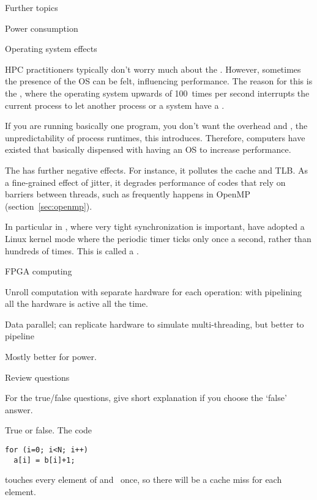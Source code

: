  {Further topics}

 {Power consumption}
\label{sec:power}


 {Operating system effects}

HPC practitioners typically don't worry much about the
. However, sometimes the presence of the \ac{OS} can be
felt, influencing performance. The reason for this is the
, where the operating system upwards
of 100~times per second interrupts the current process to let another
process or a system  have a .

If you are running basically one program, you don't want the overhead and
, the unpredictability of process
runtimes, this introduces. Therefore, computers have existed that basically dispensed
with having an \ac{OS} to increase performance.

The  has further negative
effects. For instance, it pollutes the cache and
\ac{TLB}. As a fine-grained effect of jitter, it degrades performance
of codes that rely on barriers between threads, such as frequently
happens in OpenMP (section~\ref{sec:openmp}).

In particular in , where very tight
synchronization is important, have adopted a Linux kernel mode where
the periodic timer ticks only once a second, rather than hundreds of
times. This is called a .

\begin{notready}
 {FPGA computing}

Unroll computation with separate hardware for each operation:
with pipelining all the hardware is active all the time.

Data parallel; can replicate hardware to simulate multi-threading, but
better to pipeline

Mostly better for power.
\end{notready}

 {Review questions}

For the true/false questions, give short explanation if you choose the `false' answer.

\begin{exercise}
  True or false. The code
\begin{lstlisting}
for (i=0; i<N; i++)
  a[i] = b[i]+1;
\end{lstlisting}
touches every element of  and~ once, so there will be a cache miss
for each element.
\end{exercise}

